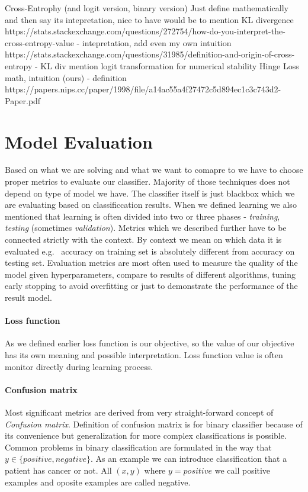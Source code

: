 Cross-Entrophy (and logit version, binary version)
Just define mathematically and then say its intepretation, nice to have would be to mention KL divergence
https://stats.stackexchange.com/questions/272754/how-do-you-interpret-the-cross-entropy-value - intepretation, add even my own intuition
https://stats.stackexchange.com/questions/31985/definition-and-origin-of-cross-entropy - KL div
mention logit transformation for numerical stability
Hinge Loss
math, intuition (ours)
\cite{Gentile1998} - definition https://papers.nips.cc/paper/1998/file/a14ac55a4f27472c5d894ec1c3c743d2-Paper.pdf



\section{Model Evaluation}
Based on what we are solving and what we want to comapre to we have to choose proper metrics to evaluate our classifier. Majority of those techniques does not depend on type of model we have. The classifier itself is just blackbox which we are evaluating based on classificcation results.
When we defined learning we also mentioned that learning is often divided into two or three phases - \emph{training}, \emph{testing} (sometimes \emph{validation}). Metrics which we described further have to be connected strictly with the context. By context we mean on which data it is evaluated e.g. \ accuracy on training set is absolutely different from accuracy on testing set. 
Evaluation metrics are most often used to measure the quality of the model given hyperparameters, compare to results of different algorithms, tuning early stopping to avoid overfitting or just to demonstrate the performance of the result model.

\paragraph{Loss function}
As we defined earlier loss function is our objective, so the value of our objective has its own meaning and possible interpretation.  Loss function value is often monitor directly during learning process.

\paragraph{Confusion matrix}
Most significant metrics are derived from very straight-forward concept of \emph{Confusion matrix}. Definition of confusion matrix is for binary classifier because of its convenience but generalization for more complex classifications is possible. Common problems in binary classification are formulated in the way that $y \in \{positive, negative\}$. As an example we can introduce classification that a patient has cancer or not. All $(x,y)$ where $y=positive$ we call positive examples and oposite examples are called negative.

